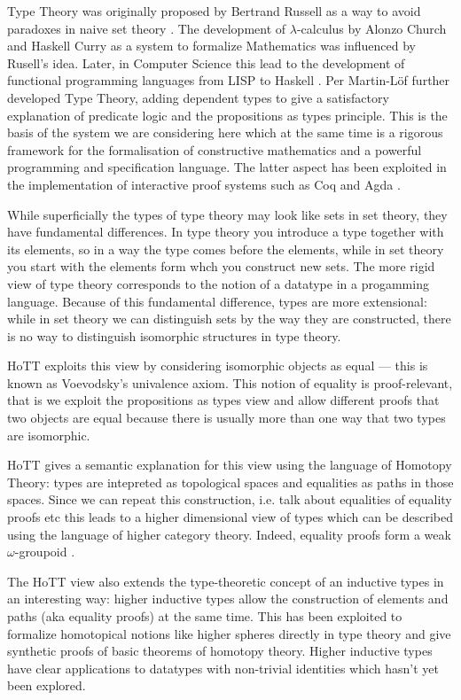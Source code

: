 \documentclass[twocolumn,a4paper,11pt]{article}
\begin{document}
Type Theory was originally proposed by Bertrand Russell as a way to
avoid paradoxes in naive set theory \cite{russell08}. The development
of $\lambda$-calculus by Alonzo Church and Haskell Curry
\cite{church33,church40,church41} as a system to formalize
Mathematics was influenced by Rusell's idea. Later, in Computer Science this
lead to the development of functional programming languages from LISP
\cite{lisp57} to Haskell \cite{haskell98}. Per Martin-L\"of further
developed Type Theory, adding dependent types to give a satisfactory
explanation of predicate logic \cite{martinLoef:tt} and the propositions as
types principle. This is the basis of the system we are considering
here which at the same time is a rigorous framework for the
formalisation of constructive mathematics and a powerful programming
and specification language. The latter aspect has been exploited in
the implementation of interactive proof systems such as Coq and Agda
\cite{CoqArt,Agda}. 

While superficially the types of type theory may look like sets in
set theory, they have fundamental differences. In type theory you
introduce a type together with its elements, so in a way the type
comes before the elements, while in set theory you start with the
elements form whch you construct new sets. The more rigid view of
type theory corresponds to the notion of a datatype in a progamming
language. Because of this fundamental difference, types are more
extensional: while in set theory we can distinguish sets by the way
they are constructed, there is no way to distinguish isomorphic
structures in type theory.

HoTT exploits this view by considering isomorphic objects as equal ---
this is known as Voevodsky's univalence axiom. This notion of equality
is proof-relevant, that is we exploit the propositions as
types view and allow different proofs that two objects are equal
because there is usually more than one way that two types are isomorphic.  

HoTT gives a semantic explanation for this view using the language of
Homotopy Theory: types are intepreted
as topological spaces and equalities as paths in those spaces. 
Since we can repeat this construction, i.e. talk about equalities of
equality proofs etc this leads to a higher dimensional view of types
which can be described using the language of higher category theory.
Indeed, equality proofs form a weak $\omega$-groupoid
\cite{lumsdaine:omegaCatsFromTT,bergGarner:typesAreWeakOG}.  

The HoTT view also extends the type-theoretic concept of an inductive
types in an interesting way: higher inductive types allow the
construction of elements and paths (aka equality proofs) at the same
time. This has been exploited to formalize homotopical notions like
higher spheres directly in type theory and give synthetic proofs of
basic theorems of homotopy theory. Higher inductive types have clear
applications to datatypes with non-trivial identities which hasn't yet
been explored. 
\end{document}
